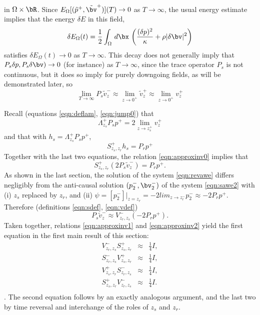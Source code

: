 in $\Omega \times \bR$. Since
$E_{\Omega}[(\tilde{p}^+,\tilde{\bv}^+)](T) \rightarrow 0$ as $T
\rightarrow \infty$, the usual energy estimate implies that the energy $\delta
E$ in this field,
\[
  \delta E_{\Omega}(t) = \frac{1}{2} \int_{\Omega} \,d\bx \,
 \left(\frac{(\delta p)^2}{\kappa} + \rho |\delta \bv|^2\right)
\]
satisfies $\delta E_{\Omega}(t) \rightarrow 0$ as $T \rightarrow
\infty$. This decay does not generally imply that $P_s\delta p, P_s \delta \bv)
\rightarrow 0$ (for instance) as $T \rightarrow \infty$, since the trace operator
$P_s$ is not continuous, but it does so imply for purely downgoing
fields, as will be demonstrated later, so
\begin{equation}
  \label{eqn:approxinv0}
  \lim_{T \rightarrow \infty} P_s\tilde{v}_z^- \approx \lim_{z \rightarrow
    0^+}\tilde{v}_z^+ \approx \lim_{z \rightarrow 0^+}v^+_z
\end{equation}
  
Recall (equations \ref{eqn:deflam}, \ref{eqn:jump0}) that
\[
  \Lambda^+_{z_s} P_s p^+ = 2 \lim_{z \rightarrow z_s^+}v^+_z 
\]
and that with $h_s= \Lambda^+_{z_s}P_sp^+$,
\[
  S^+_{z_s,z_r}h_s = P_r p^+
\]
Together with the last two equations, the relation
\ref{eqn:approxinv0} implies that
\begin{equation}
  \label{eqn:approxinv1}
  S^+_{z_s,z_r}(2 P_s \tilde{v}_z^-) = P_rp^+.
\end{equation}
As shown in the last section, the solution of the system
\ref{eqn:revawe} differs negligibly from the anti-causal solution $(p^-_2,\bv^-_2)$
of the system \ref{eqn:sawe2} with (i) $z_s$ replaced by $z_r$, and
(ii) $\psi = [p^-_2]|_{z=z_r} = -2 lim_{z \rightarrow z_r^-} p^-_2
\approx -2 P_rp^+$. Therefore (definitions \ref{eqn:sdef}, \ref{eqn:vdef})
\begin{equation}
  \label{eqn:approxinv2}
  P_s \tilde{v}_z^- \approx V^-_{z_r,z_s}(-2 P_rp^+).
\end{equation}
Taken together, relations \ref{eqn:approxinv1} and
\ref{eqn:approxinv2} yield the first equation in the first main result of this section:
\begin{eqnarray}
  \label{eqn:approxinv}
  V^-_{z_r,z_s} S^+_{z_s,z_r} & \approx & \frac{1}{4}I, \nonumber\\
  S^-_{z_r,z_s} V^+_{z_s,z_r} & \approx & \frac{1}{4}I, \nonumber\\
  V^+_{z_s,z_r} S^-_{z_r,z_s} & \approx & \frac{1}{4}I, \nonumber\\
  S^+_{z_s,z_r} V^-_{z_r,z_s} & \approx & \frac{1}{4}I.\\
\end{eqnarray}.
The second equation follows by an exactly analogous argument, and the
last two by time reversal and interchange of the roles of $z_s$ and
$z_r$.

